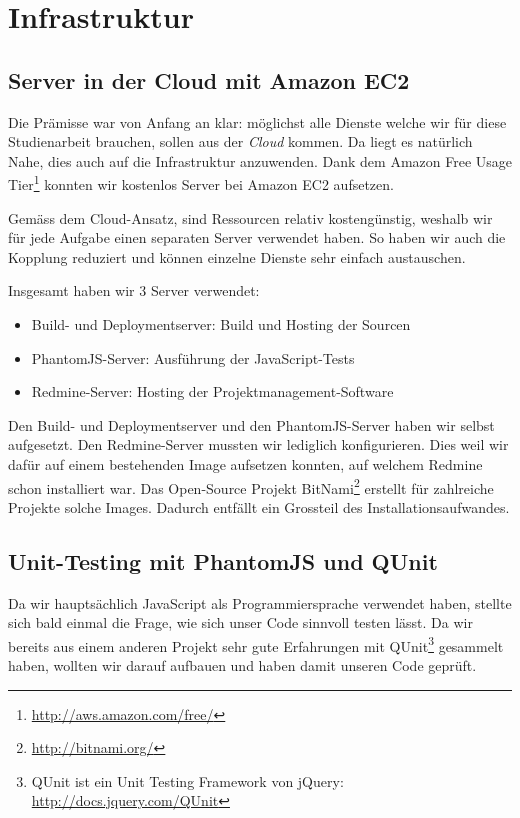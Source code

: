 \chapter{Infrastruktur}
\label{infrastruktur}
\section{Server in der Cloud mit Amazon EC2}
Die Prämisse war von Anfang an klar: möglichst alle Dienste welche wir für diese Studienarbeit brauchen, sollen aus der \emph{\gls{Cloud}} kommen. Da liegt es natürlich Nahe, dies auch auf die Infrastruktur anzuwenden. Dank dem Amazon Free Usage Tier\footnote{\url{http://aws.amazon.com/free/}} konnten wir kostenlos Server bei Amazon EC2 aufsetzen.

Gemäss dem \gls{Cloud}-Ansatz, sind Ressourcen relativ kostengünstig, weshalb wir für jede Aufgabe einen separaten Server verwendet haben. So haben wir auch die Kopplung reduziert und können einzelne Dienste sehr einfach austauschen.

Insgesamt haben wir 3 Server verwendet:
\begin{itemize}
\item Build- und Deploymentserver: Build und Hosting der Sourcen
\item PhantomJS-Server: Ausführung der JavaScript-Tests 
\item Redmine-Server: Hosting der Projektmanagement-Software
\end{itemize}

Den Build- und Deploymentserver und den PhantomJS-Server haben wir selbst aufgesetzt. Den Redmine-Server mussten wir lediglich konfigurieren. Dies weil wir dafür auf einem bestehenden Image aufsetzen konnten, auf welchem Redmine schon installiert war. Das Open-Source Projekt BitNami\footnote{\url{http://bitnami.org/}} erstellt für zahlreiche Projekte solche Images. Dadurch entfällt ein Grossteil des Installationsaufwandes.

\section{Unit-Testing mit PhantomJS und QUnit}
Da wir hauptsächlich JavaScript als Programmiersprache verwendet haben, stellte sich bald einmal die Frage, wie sich unser Code sinnvoll testen lässt. Da wir bereits aus einem anderen Projekt sehr gute Erfahrungen mit QUnit\footnote{QUnit ist ein Unit Testing Framework von jQuery: \url{http://docs.jquery.com/QUnit}} gesammelt haben, wollten wir darauf aufbauen und haben damit unseren Code geprüft.

